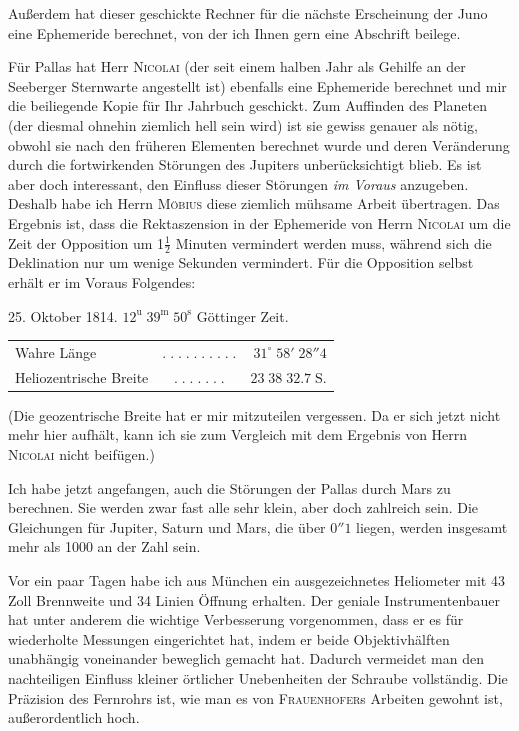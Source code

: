 \par\indent Außerdem hat dieser geschickte Rechner für die nächste Erscheinung der Juno eine Ephemeride berechnet, von der ich Ihnen gern eine Abschrift beilege.

\par\indent Für Pallas hat Herr \textsc{Nicolai} (der seit einem halben Jahr als Gehilfe an der Seeberger Sternwarte angestellt ist) ebenfalls eine Ephemeride berechnet und mir die beiliegende Kopie für Ihr Jahrbuch geschickt. Zum Auffinden des Planeten (der diesmal ohnehin ziemlich hell sein wird) ist sie gewiss genauer als nötig, obwohl sie nach den früheren Elementen berechnet wurde und deren Veränderung durch die fortwirkenden Störungen des Jupiters unberücksichtigt blieb. Es ist aber doch interessant, den Einfluss dieser Störungen \emph{im Voraus} anzugeben. Deshalb habe ich Herrn \textsc{Möbius} diese ziemlich mühsame Arbeit übertragen. Das Ergebnis ist, dass die Rektaszension in der Ephemeride von Herrn \textsc{Nicolai} um die Zeit der Opposition um 1$\frac{1}{2}$ Minuten vermindert werden muss, während sich die Deklination nur um wenige Sekunden vermindert. Für die Opposition selbst erhält er im Voraus Folgendes:

\begin{center}25. Oktober 1814. $12^{\mathrm u}\;39^{\mathrm m}\;50^{\mathrm s}$ Göttinger Zeit.\end{center}
\begin{center}\fontsize{10}{12}\selectfont\setlength{\tabcolsep}{2pt}\renewcommand{\arraystretch}{1.15}\begin{tabular}{lcr}
Wahre Länge & $.\;.\;.\;.\;.\;.\;.\;.\;.\;.$ & $31^\circ\;58'\;28''4$\\
Heliozentrische Breite & $.\;.\;.\;.\;.\;.\;.$ & $23\;38\;32.7\;\mathrm{S.}$\\
\end{tabular}\end{center}

\noindent (Die geozentrische Breite hat er mir mitzuteilen vergessen. Da er sich jetzt nicht mehr hier aufhält, kann ich sie zum Vergleich mit dem Ergebnis von Herrn \textsc{Nicolai} nicht beifügen.)

\par\indent Ich habe jetzt angefangen, auch die Störungen der Pallas durch Mars zu berechnen. Sie werden zwar fast alle sehr klein, aber doch zahlreich sein. Die Gleichungen für Jupiter, Saturn und Mars, die über $0''1$ liegen, werden insgesamt mehr als 1000 an der Zahl sein.

\par\indent Vor ein paar Tagen habe ich aus München ein ausgezeichnetes Heliometer mit 43 Zoll Brennweite und 34 Linien Öffnung erhalten. Der geniale Instrumentenbauer hat unter anderem die wichtige Verbesserung vorgenommen, dass er es für wiederholte Messungen eingerichtet hat, indem er beide Objektivhälften unabhängig voneinander beweglich gemacht hat. Dadurch vermeidet man den nachteiligen Einfluss kleiner örtlicher Unebenheiten der Schraube vollständig. Die Präzision des Fernrohrs ist, wie man es von \textsc{Frauenhofer}s Arbeiten gewohnt ist, außerordentlich hoch.
